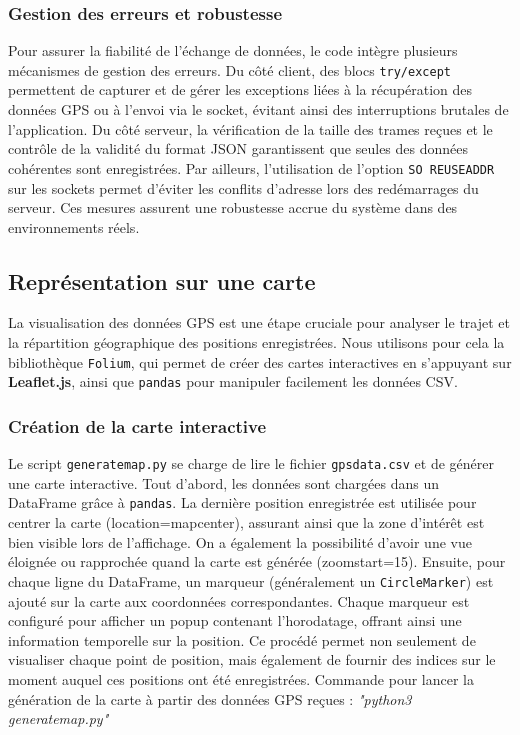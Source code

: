 \documentclass[a4paper,11pt]{article}
\begin{document}
\subsubsection{Gestion des erreurs et robustesse}
Pour assurer la fiabilité de l’échange de données, le code intègre plusieurs mécanismes de gestion des erreurs. Du côté client, des blocs \texttt{try/except} permettent de capturer et de gérer les exceptions liées à la récupération des données GPS ou à l’envoi via le socket, évitant ainsi des interruptions brutales de l’application. Du côté serveur, la vérification de la taille des trames reçues et le contrôle de la validité du format JSON garantissent que seules des données cohérentes sont enregistrées. Par ailleurs, l’utilisation de l’option \texttt{SO REUSEADDR} sur les sockets permet d’éviter les conflits d’adresse lors des redémarrages du serveur. Ces mesures assurent une robustesse accrue du système dans des environnements réels.

\subsection{Représentation sur une carte}
La visualisation des données GPS est une étape cruciale pour analyser le trajet et la répartition géographique des positions enregistrées. Nous utilisons pour cela la bibliothèque \texttt{Folium}, qui permet de créer des cartes interactives en s’appuyant sur \textbf{Leaflet.js}, ainsi que \texttt{pandas} pour manipuler facilement les données CSV.

\subsubsection{Création de la carte interactive}
Le script \texttt{generatemap.py} se charge de lire le fichier \texttt{gpsdata.csv} et de générer une carte interactive. Tout d’abord, les données sont chargées dans un DataFrame grâce à \texttt{pandas}. La dernière position enregistrée est utilisée pour centrer la carte (location=mapcenter), assurant ainsi que la zone d’intérêt est bien visible lors de l’affichage. On a également la possibilité d'avoir une vue éloignée ou rapprochée quand la carte est générée (zoomstart=15).
Ensuite, pour chaque ligne du DataFrame, un marqueur (généralement un \texttt{CircleMarker}) est ajouté sur la carte aux coordonnées correspondantes. Chaque marqueur est configuré pour afficher un popup contenant l’horodatage, offrant ainsi une information temporelle sur la position. Ce procédé permet non seulement de visualiser chaque point de position, mais également de fournir des indices sur le moment auquel ces positions ont été enregistrées. Commande pour lancer la génération de la carte à partir des données GPS reçues : \textit{"python3 generatemap.py"}
\end{document}
